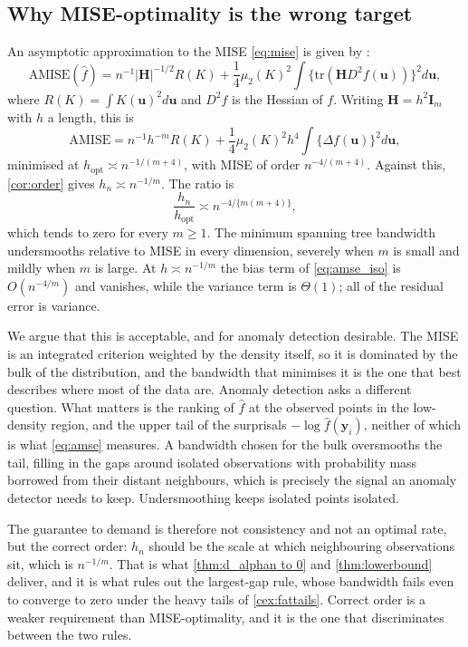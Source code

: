 \subsection{Why MISE-optimality is the wrong target}\label{sec:whynotmise}

An asymptotic approximation to the MISE \eqref{eq:mise} is given by \citet{chacon2018multivariate}:
\begin{equation}\label{eq:amse}
  \text{AMISE}(\hat{f}) = n^{-1}|\bm{H}|^{-1/2} R(K) + \frac{1}{4} \mu_2(K)^2 \int \big\{\text{tr}(\bm{H} D^2 f(\bm{u}))\big\}^2 d\bm{u},
\end{equation}
where $R(K) = \int K(\bm{u})^2 d\bm{u}$ and $D^2 f$ is the Hessian of $f$. Writing $\bm{H}=h^2\bm{I}_m$ with $h$ a length, this is
\begin{equation}\label{eq:amse_iso}
  \text{AMISE} = n^{-1} h^{-m} R(K) + \frac{1}{4} \mu_2(K)^2 h^4 \int \big\{\Delta f(\bm{u})\big\}^2 d\bm{u},
\end{equation}
minimised at $h_{\text{opt}} \asymp n^{-1/(m+4)}$, with MISE of order $n^{-4/(m+4)}$. Against this, \cref{cor:order} gives $h_n \asymp n^{-1/m}$. The ratio is
$$
\frac{h_n}{h_{\text{opt}}} \asymp n^{-4/\{m(m+4)\}},
$$
which tends to zero for every $m\geq1$. The minimum spanning tree bandwidth undersmooths relative to MISE in every dimension, severely when $m$ is small and mildly when $m$ is large. At $h\asymp n^{-1/m}$ the bias term of \eqref{eq:amse_iso} is $O(n^{-4/m})$ and vanishes, while the variance term is $\Theta(1)$; all of the residual error is variance.

We argue that this is acceptable, and for anomaly detection desirable. The MISE is an integrated criterion weighted by the density itself, so it is dominated by the bulk of the distribution, and the bandwidth that minimises it is the one that best describes where most of the data are. Anomaly detection asks a different question. What matters is the ranking of $\hat f$ at the observed points in the low-density region, and the upper tail of the surprisals $-\log\hat f(\bm{y}_i)$, neither of which is what \eqref{eq:amse} measures. A bandwidth chosen for the bulk oversmooths the tail, filling in the gaps around isolated observations with probability mass borrowed from their distant neighbours, which is precisely the signal an anomaly detector needs to keep. Undersmoothing keeps isolated points isolated.

The guarantee to demand is therefore not consistency and not an optimal rate, but the correct order: $h_n$ should be the scale at which neighbouring observations sit, which is $n^{-1/m}$. That is what \cref{thm:d_alphan to 0} and \cref{thm:lowerbound} deliver, and it is what rules out the largest-gap rule, whose bandwidth fails even to converge to zero under the heavy tails of \cref{cex:fattails}. Correct order is a weaker requirement than MISE-optimality, and it is the one that discriminates between the two rules.

